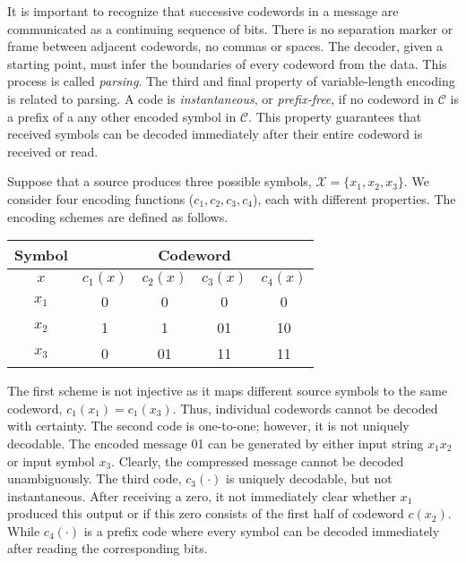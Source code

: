It is important to recognize that successive codewords in a message are communicated as a continuing sequence of bits.
There is no separation marker or frame between adjacent codewords, no commas or spaces.
The decoder, given a starting point, must infer the boundaries of every codeword from the data.
This process is called \emph{parsing}.
The third and final property of variable-length encoding is related to parsing.
A code is \emph{instantaneous}, or \emph{prefix-free}, if no codeword in $\mathcal{C}$ is a prefix of a any other encoded symbol in $\mathcal{C}$.
This property guarantees that received symbols can be decoded immediately after their entire codeword is received or read.

\begin{example}
Suppose that a source produces three possible symbols, $\mathcal{X} = \{ x_1, x_2, x_3 \}$.
We consider four encoding functions ($c_1, c_2, c_3, c_4$), each with different properties.
The encoding schemes are defined as follows.

\begin{center}
\begin{tabular}{|c|c|c|c|c|}
\hline
Symbol & \multicolumn{4}{c|}{Codeword} \\
\hline
$x$ & $c_1(x)$ & $c_2(x)$ & $c_3(x)$ & $c_4(x)$ \\
\hline
$x_1$ & 0 & 0 & 0 & 0 \\
$x_2$ & 1 & 1 & 01 & 10 \\
$x_3$ & 0 & 01 & 11 & 11 \\
\hline
\end{tabular}
\end{center}

The first scheme is not injective as it maps different source symbols to the same codeword, $c_1(x_1) = c_1(x_3)$.
Thus, individual codewords cannot be decoded with certainty.
The second code is one-to-one; however, it is not uniquely decodable.
The encoded message 01 can be generated by either input string $x_1 x_2$ or input symbol $x_3$.
Clearly, the compressed message cannot be decoded unambiguously.
The third code, $c_3(\cdot)$ is uniquely decodable, but not instantaneous.
After receiving a zero, it not immediately clear whether $x_1$ produced this output or if this zero consists of the first half of codeword $c(x_2)$.
While $c_4(\cdot)$ is a prefix code where every symbol can be decoded immediately after reading the corresponding bits.
\end{example}

